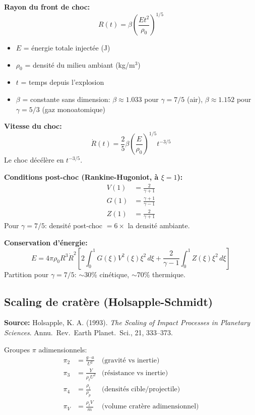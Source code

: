 \documentclass[11pt,a4paper]{article}
\begin{document}
\textbf{Rayon du front de choc:}
\begin{equation}
\boxed{R(t) = \beta \left(\frac{E t^2}{\rho_0}\right)^{1/5}}
\end{equation}
\begin{itemize}
\item $E$ = \'energie totale inject\'ee (J)
\item $\rho_0$ = densit\'e du milieu ambiant (kg/m$^3$)
\item $t$ = temps depuis l'explosion
\item $\beta$ = constante sans dimension:
  $\beta \approx 1.033$ pour $\gamma = 7/5$ (air),
  $\beta \approx 1.152$ pour $\gamma = 5/3$ (gaz monoatomique)
\end{itemize}

\textbf{Vitesse du choc:}
\begin{equation}
\dot{R}(t) = \frac{2}{5} \beta \left(\frac{E}{\rho_0}\right)^{1/5} t^{-3/5}
\end{equation}
Le choc d\'ec\'el\`ere en $t^{-3/5}$.

\textbf{Conditions post-choc (Rankine-Hugoniot, \`a $\xi = 1$):}
\begin{align}
V(1) &= \frac{2}{\gamma + 1} \\
G(1) &= \frac{\gamma + 1}{\gamma - 1} \\
Z(1) &= \frac{2}{\gamma + 1}
\end{align}
Pour $\gamma = 7/5$: densit\'e post-choc $= 6\times$ la densit\'e ambiante.

\textbf{Conservation d'\'energie:}
\begin{equation}
E = 4\pi \rho_0 R^3 \dot{R}^2 \left[
2\int_0^1 G(\xi) V^2(\xi) \xi^2 \, d\xi
+ \frac{2}{\gamma - 1} \int_0^1 Z(\xi) \xi^2 \, d\xi
\right]
\end{equation}
Partition pour $\gamma = 7/5$: $\sim$30\% cin\'etique, $\sim$70\% thermique.

\subsection{Scaling de crat\`ere (Holsapple-Schmidt)}

\textbf{Source:} Holsapple, K. A. (1993).
\textit{The Scaling of Impact Processes in Planetary Sciences}.
Annu.\ Rev.\ Earth Planet.\ Sci., 21, 333--373.

Groupes $\pi$ adimensionnels:
\begin{align}
\pi_2 &= \frac{g \cdot a}{U^2} & \text{(gravit\'e vs inertie)} \\
\pi_3 &= \frac{Y}{\rho_t U^2} & \text{(r\'esistance vs inertie)} \\
\pi_4 &= \frac{\rho_t}{\rho_p} & \text{(densit\'es cible/projectile)} \\
\pi_V &= \frac{\rho_t V}{m} & \text{(volume crat\`ere adimensionnel)}
\end{align}
\end{document}
